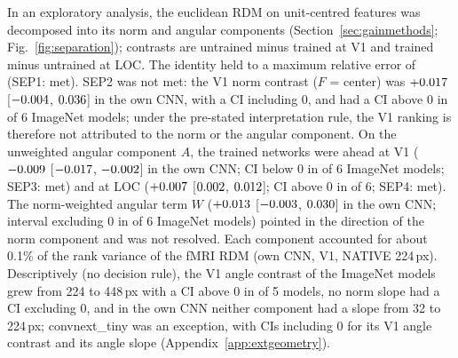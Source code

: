 In an exploratory analysis, the euclidean RDM on unit-centred features was decomposed into its norm
and angular components (Section~\ref{sec:gainmethods}; Fig.~\ref{fig:separation}); contrasts are
untrained minus trained at V1 and trained minus untrained at LOC. The identity held to a maximum
relative error of \SepOneMaxRelError{} (SEP1: met). SEP2 was not met: the V1 norm contrast
($F$ = center) was $+0.017$ [$-0.004$, $0.036$]
in the own CNN, with a CI including 0, and had a CI above 0 in \SepTwoModels{} of 6 ImageNet
models; under the pre-stated interpretation rule, the V1 ranking is therefore not attributed to the
norm or the angular component. On the unweighted angular component $A$, the trained networks were
ahead at V1 ($-0.009$ [$-0.017$, $-0.002$] in
the own CNN; CI below 0 in \SepThreeModels{} of 6 ImageNet models; SEP3: met) and at LOC
($+0.007$ [$0.002$, $0.012$]; CI above 0 in
\SepFourModels{} of 6; SEP4: met). The norm-weighted angular term $W$ ($+0.013$
[$-0.003$, $0.030$] in the own CNN; interval excluding 0 in \WAngImnPosModels{}
of 6 ImageNet models) pointed in the direction of the norm component and was not resolved. Each
component accounted for about 0.1\% of the rank variance of the fMRI RDM (own CNN, V1, NATIVE
224\,px). Descriptively (no decision rule), the V1 angle contrast of the ImageNet models grew from
224 to 448\,px with a CI above 0 in \SepSlopeAngleCiPositive{} of 5 models, no norm slope had a CI
excluding 0, and in the own CNN neither component had a slope from 32 to 224\,px; convnext\_tiny
was an exception, with CIs including 0 for its V1 angle contrast and its angle slope
(Appendix~\ref{app:extgeometry}).
